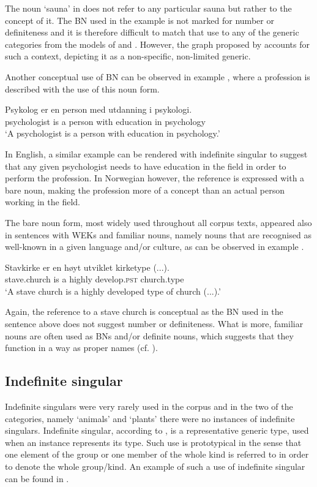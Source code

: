 \documentclass[output=paper]{langsci/langscibook}
\begin{document}
The noun `sauna' in  does not refer to any particular sauna but rather to the concept of it. The BN used in the example is not marked for number or definiteness and it is therefore difficult to match that use to any of the generic categories from the models of \citet{Radden2007} and \citet{Radden2009}. However, the graph proposed by \citet{Pettersson1976} accounts for such a context, depicting it as a non-specific, non-limited generic.

Another conceptual use of BN can be observed in example , where a profession is described with the use of this noun form.

\ea\label{ex:psykolog}
\gll Psykolog er en person med utdanning i psykologi. \\
		psychologist is a person with education in psychology \\
	\glt `A psychologist is a person with education in psychology.'
\z
	
In English, a similar example can be rendered with indefinite singular to suggest that any given psychologist needs to have education in the field in order to perform the profession. In Norwegian however, the reference is expressed with a bare noun, making the profession more of a concept than an actual person working in the field.

The bare noun form, most widely used throughout all corpus texts, appeared also in sentences with WEKs and familiar nouns, namely nouns that are recognised as well-known in a given language and/or culture, as can be observed in example .

\ea\label{ex:stavkirke}
\gll Stavkirke er en høyt utviklet kirketype (...). \\
	stave.church is a highly develop.\textsc{pst} church.type \\
	\glt `A stave church is a highly developed type of church (...).'
\z

Again, the reference to a stave church is conceptual as the BN used in the sentence above does not suggest number or definiteness. What is more, familiar nouns are often used as BNs and/or definite nouns, which suggests that they function in a way as proper names (cf. \citealp{GenBook1995}).

\subsection{Indefinite singular}
\label{sub:indsg}
Indefinite singulars were very rarely used in the corpus and in the two of the categories, namely `animals' and `plants' there were no instances of indefinite singulars. Indefinite singular, according to \citet{Radden2009}, is a representative generic type, used when an instance represents its type. Such use is prototypical in the sense that one element of the group or one member of the whole kind is referred to in order to denote the whole group/kind. An example of such a use of indefinite singular can be found in .
\end{document}
